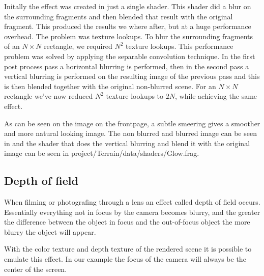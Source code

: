 Initally the effect was created in just a single shader. This shader
did a blur on the surrounding fragments and then blended that result
with the original fragment. This produced the results we where after,
but at a huge performance overhead. The problem was texture
lookups. To blur the surrounding fragments of an $N \times N$
rectangle, we required $N^2$ texture lookups. This performance problem
was solved by applying the separable convolution technique. In the
first post process pass a horizontal blurring is performed, then in
the second pass a vertical blurring is performed on the resulting
image of the previous pass and this is then blended together with the
original non-blurred scene. For an $N \times N$ rectangle we've now
reduced $N^2$ texture lookups to $2N$, while achieving the same
effect.

As can be seen on the image on the frontpage, a subtle smeering gives
a smoother and more natural looking image. The non blurred and blurred
image can be seen in  and the shader that does the
vertical blurring and blend it with the original image can be seen in
project/Terrain/data/shaders/Glow.frag.

\begin{figure}
  \centering
  \label{fig:glow}
\end{figure}



\subsection{Depth of field}

When filming or photografing through a lens an effect called depth of
field occurs. Essentially everything not in focus by the camera
becomes blurry, and the greater the difference between the object in
focus and the out-of-focus object the more blurry the object will
appear.

With the color texture and depth texture of the rendered scene it is
possible to emulate this effect. In our example the focus of the
camera will always be the center of the screen.

